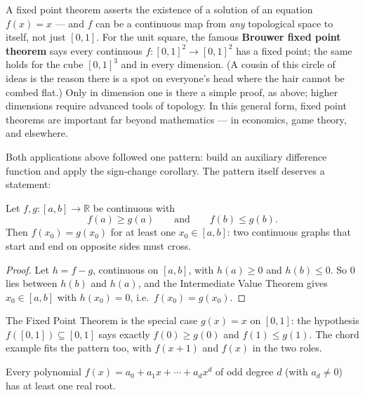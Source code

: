 \documentclass[11pt]{report}
\begin{document}
\begin{rembox}
A fixed point theorem asserts the existence of a solution of an equation $f(x) = x$ --- and $f$ can be a continuous map from \emph{any} topological space to itself, not just $[0,1]$. For the unit square, the famous \textbf{Brouwer fixed point theorem} says every continuous $f: [0,1]^2 \to [0,1]^2$ has a fixed point; the same holds for the cube $[0,1]^3$ and in every dimension. (A cousin of this circle of ideas is the reason there is a spot on everyone's head where the hair cannot be combed flat.) Only in dimension one is there a simple proof, as above; higher dimensions require advanced tools of topology. In this general form, fixed point theorems are important far beyond mathematics --- in economics, game theory, and elsewhere.
\end{rembox}

Both applications above followed one pattern: build an auxiliary difference function and apply the sign-change corollary. The pattern itself deserves a statement:

\begin{propbox}
Let $f, g: [a,b] \to \mathbb{R}$ be continuous with
\[
f(a) \geq g(a) \qquad \text{and} \qquad f(b) \leq g(b).
\]
Then $f(x_0) = g(x_0)$ for at least one $x_0 \in [a,b]$: two continuous graphs that start and end on opposite sides must cross.
\end{propbox}

\begin{proof}
Let $h = f - g$, continuous on $[a,b]$, with $h(a) \geq 0$ and $h(b) \leq 0$. So $0$ lies between $h(b)$ and $h(a)$, and the Intermediate Value Theorem gives $x_0 \in [a,b]$ with $h(x_0) = 0$, i.e.\ $f(x_0) = g(x_0)$.
\end{proof}

\begin{rembox}
The Fixed Point Theorem is the special case $g(x) = x$ on $[0,1]$: the hypothesis $f([0,1]) \subseteq [0,1]$ says exactly $f(0) \geq g(0)$ and $f(1) \leq g(1)$. The chord example fits the pattern too, with $f(x+1)$ and $f(x)$ in the two roles.
\end{rembox}

\begin{propbox}
Every polynomial $f(x) = a_0 + a_1 x + \cdots + a_{d} x^{d}$ of odd degree $d$ (with $a_d \neq 0$) has at least one real root.
\end{propbox}
\end{document}
